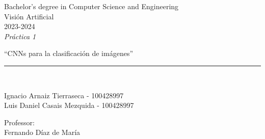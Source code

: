 \def\degree{Bachelor's degree in Computer Science and Engineering}
\def\subject{Visión Artificial}
\def\year{2023-2024}
\def\labType{Práctica 1}
\def\labName{CNNs para la clasificación de imágenes}
\def\proffesor{Fernando Díaz de María}

\begin{titlepage}
	\begin{sffamily}
	\color{azulUC3M}
	\begin{center}

		\begin{figure}[H]
		\end{figure}
		\vspace{1.5cm}

		\begin{Large}
			\degree\\
            \subject\\
			\year\\
			\vspace{2cm}		
			\textsl{\labType}
			\bigskip
			
		\end{Large}

		{\Huge ``\labName''}\\

		\vspace*{0.5cm}
		\rule{10.5cm}{0.1mm}\\
		\vspace*{0.9cm}
		
 		{\LARGE Ignacio Arnaiz Tierraseca - 100428997}\\
 		\vspace*{0.2cm}
 		{\LARGE Luis Daniel Casais Mezquida - 100428997}\\
 		\vspace*{0.2cm}
		
		\vspace*{0.8cm}
		
		\begin{Large}
		    Professor:\\
			\proffesor\\
		\end{Large}

	\end{center}
	\vfill
	\end{sffamily}
\end{titlepage}